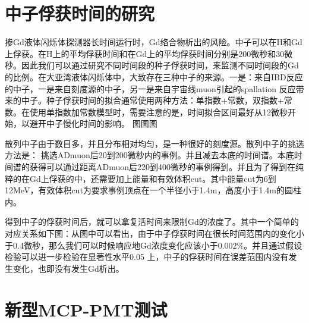 \section{中子俘获时间的研究}
掺Gd液体闪烁体探测器长时间运行时，Gd络合物析出的风险。中子可以在H和Gd上俘获。在H上的平均俘获时间和在Gd上的平均俘获时间分别是200微秒和30微秒。因此我们可以通过研究不同时间段的种子俘获时间，来监测不同时间段的Gd的比例。在大亚湾液体闪烁体中，大致存在三种中子的来源。一是：来自IBD反应的中子，一是来自刻度源的中子，另一是来自宇宙线muon引起的spallation 反应带来的中子。种子俘获时间的拟合通常使用两种方法：单指数+常数，双指数+常数。在使用单指数加常数模型时，需要注意的是，时间拟合区间最好从12微秒开始，以避开中子慢化时间的影响。
图图图



散列中子由于数目多，并且分布相对均匀，是一种很好的刻度源。散列中子的挑选方法是：
挑选ADmuon后20到200微秒内的事例。并且减去本底的时间谱。本底时间谱的获得可以通过距离ADmuon后220到400微秒的事例得到。并且为了得到在纯粹的在Gd上俘获的中，还需要加上能量和有效体积cut。其中能量cut为6到12MeV，有效体积cut为要求事例顶点在一个半径小于1.4m，高度小于1.4m的圆柱内。

得到中子的俘获时间后，就可以拿复活时间来限制Gd的浓度了。其中一个简单的对应关系如下图：从图中可以看出，由于中子俘获时间在很长时间范围内的变化小于0.4微秒，那么我们可以时候响应地Gd浓度变化应该小于0.002\%。并且通过假设检验可以进一步检验在显著性水平0.05 上，中子的俘获时间在误差范围内没有发生变化，也即没有发生Gd析出。



\section{新型MCP-PMT测试}



